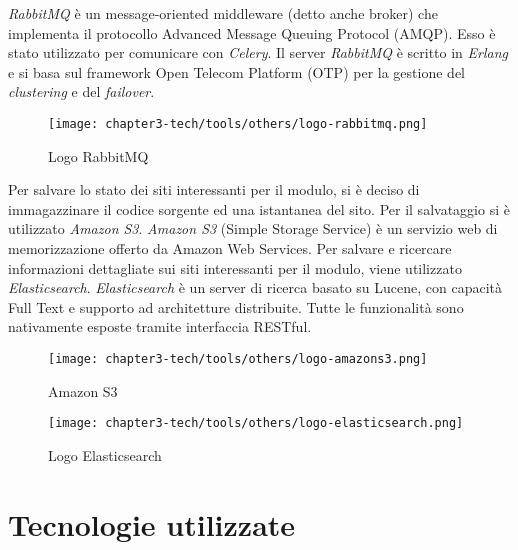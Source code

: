\noindent
\emph{RabbitMQ} è un message-oriented middleware (detto anche \gls{broker}) che implementa il protocollo Advanced Message Queuing Protocol (AMQP). Esso è stato utilizzato per comunicare con \emph{Celery}. Il server \emph{RabbitMQ} è scritto in \emph{Erlang} e si basa sul framework Open Telecom Platform (OTP) per la gestione del \emph{clustering} e del \emph{failover}.
\begin{figure}[!h] 
    \centering 
    \texttt{[image: chapter3-tech/tools/others/logo-rabbitmq.png]} 
    \caption{Logo RabbitMQ}
    \label{fig:rabbitmq} 
\end{figure}

\noindent
Per salvare lo stato dei siti interessanti per il modulo, si è deciso di immagazzinare il codice sorgente ed una istantanea del sito. Per il salvataggio si è utilizzato \emph{Amazon S3}. \emph{Amazon S3} (Simple Storage Service) è un servizio web di memorizzazione offerto da Amazon Web Services.\newline{} Per salvare e ricercare informazioni dettagliate sui siti interessanti per il modulo, viene utilizzato \emph{Elasticsearch}. \emph{Elasticsearch} è un server di ricerca basato su Lucene, con capacità Full Text e supporto ad architetture distribuite. Tutte le funzionalità sono nativamente esposte tramite interfaccia RESTful.
\begin{figure}[!h]
    \begin{minipage}{.5\textwidth} 
        \centering 
        \texttt{[image: chapter3-tech/tools/others/logo-amazons3.png]} 
        \caption{Amazon S3} 
        \label{fig:amazons3} 
    \end{minipage}%
    \begin{minipage}{.5\textwidth} 
        \centering 
        \texttt{[image: chapter3-tech/tools/others/logo-elasticsearch.png]} 
        \caption{Logo Elasticsearch} 
        \label{fig:elasticsearch} 
    \end{minipage}%
\end{figure} 

\section{Tecnologie utilizzate}

